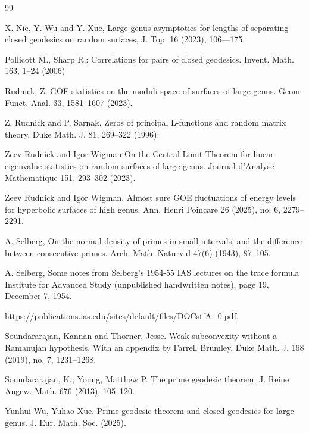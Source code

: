 \documentclass[12pt]{amsart}
\begin{document}
\begin{thebibliography}{99}


 X. Nie, Y. Wu and Y. Xue, Large genus asymptotics for lengths of separating
closed geodesics on random surfaces, J. Top. 16 (2023), 106–--175.

Pollicott M., Sharp R.: Correlations for pairs of closed geodesics. Invent. Math. 163, 1--24 (2006)

Rudnick, Z. GOE statistics on the moduli space of surfaces of large genus. Geom. Funct. Anal. 33, 1581--1607 (2023).  

Z. Rudnick and P. Sarnak, Zeros of principal L-functions and random matrix theory. Duke Math. J. 81, 269--322 (1996).

Zeev Rudnick and Igor Wigman On the Central Limit Theorem for linear eigenvalue statistics on random surfaces of large genus. Journal d'Analyse Mathematique 151, 293--302 (2023).

Zeev Rudnick and Igor Wigman. Almost sure GOE fluctuations of energy levels for hyperbolic surfaces of high genus. Ann. Henri Poincare 26 (2025), no. 6, 2279--2291. 

A. Selberg, On the normal density of primes in small intervals, and the difference between
consecutive primes. Arch. Math. Naturvid 47(6) (1943), 87--105.

A. Selberg, Some notes from Selberg's 1954-55 IAS lectures on the trace formula Institute for Advanced Study (unpublished  handwritten notes),  page 19, December 7, 1954.

\newblock 
\url{https://publications.ias.edu/sites/default/files/DOCstfA_0.pdf}.


Soundararajan, Kannan and Thorner, Jesse. 
Weak subconvexity without a Ramanujan hypothesis. 
With an appendix by Farrell Brumley.
Duke Math. J. 168 (2019), no. 7, 1231--1268.
 

 Soundararajan, K.; Young, Matthew P. 
 The prime geodesic theorem. 
 J. Reine Angew. Math. 676 (2013), 105--120.

Yunhui Wu, Yuhao Xue, Prime geodesic theorem and closed geodesics for large genus. J. Eur. Math. Soc. (2025). 

\end{thebibliography}
\end{document}
